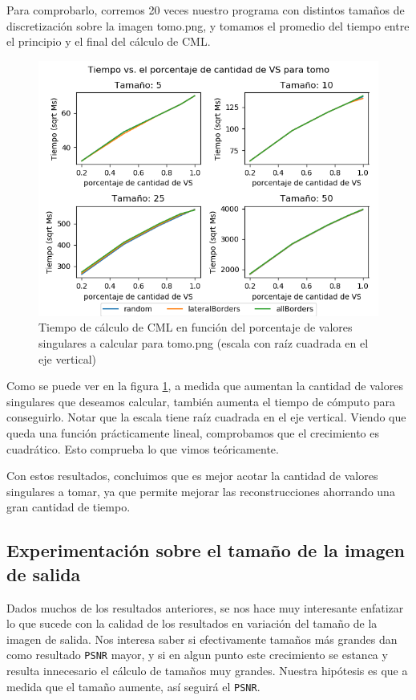 Para comprobarlo, corremos 20 veces nuestro programa con distintos tamaños de discretización
sobre la imagen tomo.png, y tomamos el promedio del tiempo entre el principio y el final del cálculo de CML.
\begin{figure}[H]
    \centering
    \includegraphics[width=\textwidth]{../graficos/eigens-time/tomo/noise_graph.png}
    \caption{Tiempo de cálculo de CML en función del porcentaje de valores singulares a calcular para tomo.png 
    (escala con raíz cuadrada en el eje vertical)}
    \label{fig:exp-eigenvalues-time}
\end{figure}

Como se puede ver en la figura \ref{fig:exp-eigenvalues-time},
a medida que aumentan la cantidad de valores singulares que deseamos calcular,
también aumenta el tiempo de cómputo para conseguirlo.
Notar que la escala tiene raíz cuadrada en el eje vertical.
Viendo que queda una función prácticamente lineal,
comprobamos que el crecimiento es cuadrático.
Esto comprueba lo que vimos teóricamente.

Con estos resultados, concluimos que es mejor acotar la cantidad de valores singulares a tomar,
ya que permite mejorar las reconstrucciones ahorrando una gran cantidad de tiempo.


\subsection{Experimentación sobre el tamaño de la imagen de salida}
Dados muchos de los resultados anteriores, se nos hace muy interesante enfatizar lo que sucede con la calidad de los resultados
en variación del tamaño de la imagen de salida. Nos interesa saber si efectivamente tamaños más grandes dan como resultado
\verb|PSNR| mayor, y si en algun punto este crecimiento se estanca y resulta innecesario el cálculo de tamaños muy grandes.
Nuestra hipótesis es que a medida que el tamaño aumente, así seguirá el \verb|PSNR|.

